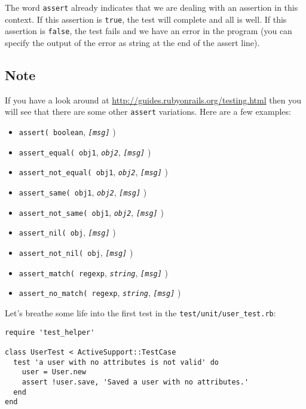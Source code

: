 \documentclass[a4paper]{book}
\begin{document}
The word \texttt{assert} already indicates that we are dealing with an assertion in this context. If this assertion is \texttt{true}, the test will complete and all is well. If this assertion is \texttt{false}, the test fails and we have an error in the program (you can specify the output of the error as string at the end of the assert line).

\subsection{Note}\label{note-41}

If you have a look around at \url{http://guides.rubyonrails.org/testing.html} then you will see that there are some other \texttt{assert} variations. Here are a few examples:

\begin{itemize}
\itemsep1pt\parskip0pt
\item
  \texttt{assert( boolean}, \emph{\texttt{{[}msg{]}}} )
\item
  \texttt{assert\_equal( obj1}, \emph{\texttt{obj2}}, \emph{\texttt{{[}msg{]}}} )
\item
  \texttt{assert\_not\_equal( obj1}, \emph{\texttt{obj2}}, \emph{\texttt{{[}msg{]}}} )
\item
  \texttt{assert\_same( obj1}, \emph{\texttt{obj2}}, \emph{\texttt{{[}msg{]}}} )
\item
  \texttt{assert\_not\_same( obj1}, \emph{\texttt{obj2}}, \emph{\texttt{{[}msg{]}}} )
\item
  \texttt{assert\_nil( obj}, \emph{\texttt{{[}msg{]}}} )
\item
  \texttt{assert\_not\_nil( obj}, \emph{\texttt{{[}msg{]}}} )
\item
  \texttt{assert\_match( regexp}, \emph{\texttt{string}}, \emph{\texttt{{[}msg{]}}} )
\item
  \texttt{assert\_no\_match( regexp}, \emph{\texttt{string}}, \emph{\texttt{{[}msg{]}}} )
\end{itemize}

Let's breathe some life into the first test in the \texttt{test/unit/user\_test.rb}:

\begin{shaded}\begin{verbatim}
require 'test_helper'

class UserTest < ActiveSupport::TestCase
  test 'a user with no attributes is not valid' do
    user = User.new
    assert !user.save, 'Saved a user with no attributes.'
  end
end
\end{verbatim}\end{shaded}
\end{document}
